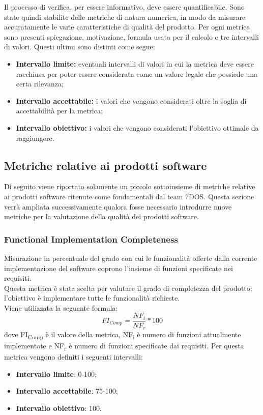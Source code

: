 Il processo di verifica, per essere informativo, deve essere quantificabile. Sono state quindi stabilite delle metriche di natura numerica, in modo da misurare accuratamente le varie caratteristiche di qualità del prodotto. Per ogni metrica sono presenti  spiegazione, motivazione, formula usata per il calcolo e tre intervalli di valori. Questi ultimi sono distinti come segue:
\begin{itemize}
	\item {\textbf{Intervallo limite:} eventuali intervalli di valori in cui la metrica deve essere racchiusa per poter essere considerata come un valore legale che possiede una certa rilevanza;}
	\item {\textbf{Intervallo accettabile:} i valori che vengono considerati oltre la soglia di accettabilità per la metrica;}
	\item {\textbf{Intervallo obiettivo:} i valori che vengono considerati l'obiettivo ottimale da raggiungere.}
\end{itemize}

 
\subsection{Metriche relative ai prodotti software}
Di seguito viene riportato solamente un piccolo sottoinsieme di metriche relative ai prodotti software ritenute come fondamentali dal team 7DOS.
Questa sezione verrà ampliata successivamente qualora fosse necessario introdurre nuove metriche per la valutazione della qualità dei prodotti software. 
\subsubsection{Functional Implementation Completeness}
Misurazione in percentuale del grado con cui le funzionalità offerte dalla corrente implementazione del software coprono l'insieme di funzioni specificate nei requisiti.\\
Questa metrica è stata scelta per valutare il grado di completezza del prodotto; l'obiettivo è implementare tutte le funzionalità richieste.\\
Viene utilizzata la seguente formula:
$$FI_{Comp}=\frac{NF_i}{NF_r}*100$$
dove FI\textsubscript{Comp} è il valore della metrica, NF\textsubscript{i} è numero di funzioni attualmente implementate e NF\textsubscript{r} è numero di funzioni specificate dai requisiti.
Per questa metrica vengono definiti i seguenti intervalli: 
\begin{itemize}
	\item{\textbf{Intervallo limite}: 0-100;}
	\item{\textbf{Intervallo accettabile}: 75-100;}
	\item{\textbf{Intervallo obiettivo}: 100.}
\end{itemize}

